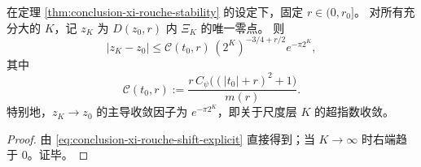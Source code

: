 \begin{corollary}[尺度递归求零的超指数收敛]\label{cor:conclusion-xi-root-superexp-convergence}
在定理 \ref{thm:conclusion-xi-rouche-stability} 的设定下，固定 \(r\in(0,r_0]\)。
对所有充分大的 \(K\)，记 \(z_K\) 为 \(D(z_0,r)\) 内 \(\Xi_K\) 的唯一零点。
则
\[
|z_K-z_0|
\le
\mathcal C(t_0,r)\,(2^K)^{-3/4+r/2}e^{-\pi 2^K},
\]
其中
\[
\mathcal C(t_0,r):=\frac{r\,C_{\psi}\bigl((|t_0|+r)^2+1\bigr)}{m(r)}.
\]
特别地，\(z_K\to z_0\) 的主导收敛因子为 \(e^{-\pi 2^K}\)，即关于尺度层 \(K\) 的超指数收敛。
\end{corollary}
\begin{proof}
由 \eqref{eq:conclusion-xi-rouche-shift-explicit} 直接得到；当 \(K\to\infty\) 时右端趋于 \(0\)。证毕。
\end{proof}
